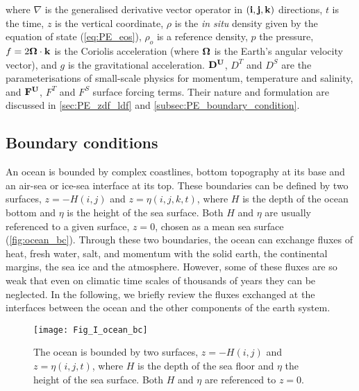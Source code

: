 \documentclass[../main/NEMO_manual]{subfiles}
\begin{document}
where $\nabla$ is the generalised derivative vector operator in $(\bf i,\bf j, \bf k)$ directions, $t$ is the time,
$z$ is the vertical coordinate, $\rho $ is the \textit{in situ} density given by the equation of state
(\autoref{eq:PE_eos}), $\rho_o$ is a reference density, $p$ the pressure,
$f=2 \bf \Omega \cdot \bf k$ is the Coriolis acceleration
(where $\bf \Omega$ is the Earth's angular velocity vector), and $g$ is the gravitational acceleration.
${\rm {\bf D}}^{\rm {\bf U}}$, $D^T$ and $D^S$ are the parameterisations of small-scale physics for momentum,
temperature and salinity, and ${\rm {\bf F}}^{\rm {\bf U}}$, $F^T$ and $F^S$ surface forcing terms.
Their nature and formulation are discussed in \autoref{sec:PE_zdf_ldf} and \autoref{subsec:PE_boundary_condition}.



\subsection{Boundary conditions}
\label{subsec:PE_boundary_condition}

An ocean is bounded by complex coastlines, bottom topography at its base and
an air-sea or ice-sea interface at its top.
These boundaries can be defined by two surfaces, $z=-H(i,j)$ and $z=\eta(i,j,k,t)$,
where $H$ is the depth of the ocean bottom and $\eta$ is the height of the sea surface.
Both $H$ and $\eta$ are usually referenced to a given surface, $z=0$, chosen as a mean sea surface
(\autoref{fig:ocean_bc}).
Through these two boundaries, the ocean can exchange fluxes of heat, fresh water, salt, and momentum with
the solid earth, the continental margins, the sea ice and the atmosphere.
However, some of these fluxes are so weak that even on climatic time scales of thousands of years
they can be neglected.
In the following, we briefly review the fluxes exchanged at the interfaces between the ocean and
the other components of the earth system.

\begin{figure}[!ht]
  \begin{center}
    \texttt{[image: Fig\_I\_ocean\_bc]}
    \caption{	 \protect\label{fig:ocean_bc}
      The ocean is bounded by two surfaces, $z=-H(i,j)$ and $z=\eta(i,j,t)$,
      where $H$ is the depth of the sea floor and $\eta$ the height of the sea surface.
      Both $H$ and $\eta$ are referenced to $z=0$.
    }
  \end{center}
\end{figure}
\end{document}
